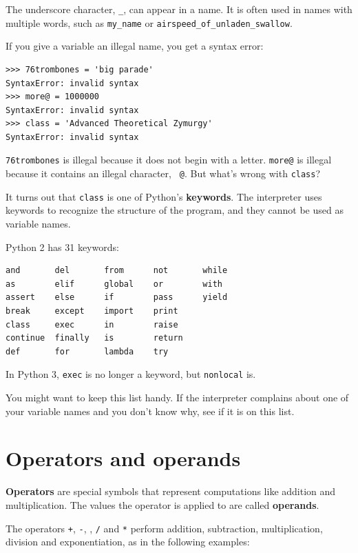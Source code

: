\documentclass[10pt]{book}
\begin{document}
The underscore character, \verb"_", can appear in a name.
It is often used in names with multiple words, such as
\verb"my_name" or \verb"airspeed_of_unladen_swallow".

If you give a variable an illegal name, you get a syntax error:

\begin{verbatim}
>>> 76trombones = 'big parade'
SyntaxError: invalid syntax
>>> more@ = 1000000
SyntaxError: invalid syntax
>>> class = 'Advanced Theoretical Zymurgy'
SyntaxError: invalid syntax
\end{verbatim}
%
{\tt 76trombones} is illegal because it does not begin with a letter.
{\tt more@} is illegal because it contains an illegal character, {\tt
@}.  But what's wrong with {\tt class}?

It turns out that {\tt class} is one of Python's {\bf keywords}.  The
interpreter uses keywords to recognize the structure of the program,
and they cannot be used as variable names.

Python 2 has 31 keywords:

\begin{verbatim}
and       del       from      not       while    
as        elif      global    or        with     
assert    else      if        pass      yield    
break     except    import    print              
class     exec      in        raise              
continue  finally   is        return             
def       for       lambda    try
\end{verbatim}
%
In Python 3, {\tt exec} is no longer a keyword, but {\tt nonlocal} is.

You might want to keep this list handy.  If the interpreter complains
about one of your variable names and you don't know why, see if it
is on this list.


\section{Operators and operands}

{\bf Operators} are special symbols that represent computations like
addition and multiplication.  The values the operator is applied to
are called {\bf operands}.

The operators {\tt +}, {\tt -}, {\tt *}, {\tt /} and {\tt **}
perform addition, subtraction, multiplication, division and
exponentiation, as in the following examples:
\end{document}
